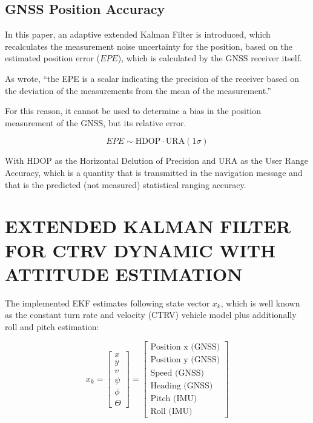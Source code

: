 \documentclass[a4paper,twoside]{article}
\begin{document}
\subsection{GNSS Position Accuracy}

In this paper, an adaptive extended Kalman Filter is introduced, which recalculates the measurement noise uncertainty for the position, based on the estimated position error ($EPE$), which is calculated by the GNSS receiver itself.

As \cite{Sharif} wrote, ``the EPE is a scalar indicating the precision of the receiver based on the deviation of the measurements from the mean of the measurement.''

For this reason, it cannot be used to determine a bias in the position measurement of the GNSS, but its relative error.

\begin{equation}EPE \sim \mathrm{HDOP} \cdot \mathrm{URA}(1 \sigma)\end{equation}

With $\text{HDOP}$ as the Horizontal Delution of Precision and $\text{URA}$ as the User Range Accuracy, which is a quantity that is transmitted in the navigation message and that is the predicted (not measured) statistical ranging accuracy.


\section{\uppercase{Extended Kalman Filter for CTRV dynamic with Attitude Estimation}}

The implemented EKF estimates following state vector $x_k$, which is well known as the constant turn rate and velocity (CTRV) vehicle model plus additionally roll and pitch estimation:

\begin{equation}\label{state}x_k= \left[ \begin{matrix} x\\y\\ v \\ \psi\\\phi\\\Theta \end{matrix}\right] = \left[ \begin{matrix} \text{Position x (GNSS)}\\ \text{Position y (GNSS)}\\ \text{Speed (GNSS)} \\ \text{Heading (GNSS)} \\ \text{Pitch (IMU)} \\ \text{Roll (IMU)} \end{matrix}\right]\end{equation}
\end{document}
